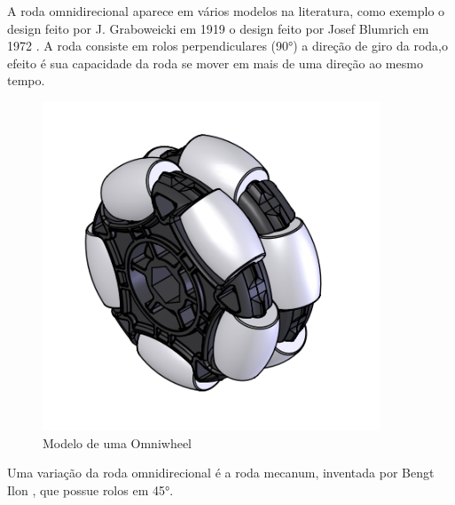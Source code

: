 A roda omnidirecional aparece em vários modelos na literatura, como exemplo o design feito por J. Graboweicki em 1919 \cite{patent_US1305535A}
o design feito por Josef Blumrich em 1972 \cite{patent_US3789947A}.
A roda consiste em rolos perpendiculares (90°) a direção de giro da roda,o efeito é sua capacidade da roda se mover em mais de uma direção ao mesmo tempo.

\begin{figure}[h]
	\centering
	\includegraphics{figures/omniwheel}
	\caption{Modelo de uma Omniwheel \cite{draw_omniwheel}}
\end{figure}

Uma variação da roda omnidirecional é a roda mecanum, inventada por Bengt Ilon \cite{patent_US3876255A}, que possue rolos em 45°.